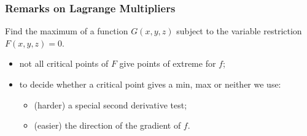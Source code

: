 \begin{frame}
\frametitle{Remarks on Lagrange Multipliers}
\begin{problem}
Find the maximum of a function $G(x,y,z)$ subject to the variable restriction $F(x,y,z)=0$.
\end{problem}
\begin{itemize}
\item  not all critical points of $F$ give points of extreme for $f$;
\item to decide whether a critical point gives a min, max or neither we use:
\begin{itemize}
\item (harder) a special second derivative test;
\item (easier) the direction of the gradient of $f$.
\end{itemize}
\end{itemize}
\end{frame}
